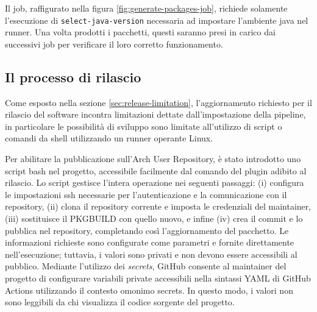 Il job, raffigurato nella figura \ref{fig:generate-packages-job}, richiede solamente l'esecuzione di \texttt{select\--java\--version} necessaria ad impostare l'ambiente java nel runner. Una volta prodotti i pacchetti, questi saranno presi in carico dai successivi job per verificare il loro corretto funzionamento.

\subsection{Il processo di rilascio}

Come esposto nella sezione \ref{sec:release-limitation}, l'aggiornamento richiesto per il rilascio del software incontra limitazioni dettate dall'impostazione della pipeline, in particolare le possibilità di sviluppo sono limitate all'utilizzo di script o comandi da shell utilizzando un runner operante Linux.

Per abilitare la pubblicazione sull'Arch User Repository, è stato introdotto uno script bash nel progetto, accessibile facilmente dal comando del plugin adibito al rilascio. Lo script gestisce l'intera operazione nei seguenti passaggi: (i) configura le impostazioni ssh necessarie per l'autenticazione e la comunicazione con il repository, (ii) clona il repository corrente e imposta le credenziali del maintainer, (iii) sostituisce il PKGBUILD con quello nuovo, e infine (iv) crea il commit e lo pubblica nel repository, completando così l'aggiornamento del pacchetto. Le informazioni richieste sono configurate come parametri e fornite direttamente nell'esecuzione; tuttavia, i valori sono privati e non devono essere accessibili al pubblico. Mediante l'utilizzo dei \textit{secrets}, GitHub consente al maintainer del progetto di configurare variabili private accessibili nella sintassi YAML di GitHub Actions utilizzando il contesto omonimo secrets. In questo modo, i valori non sono leggibili da chi visualizza il codice sorgente del progetto.

